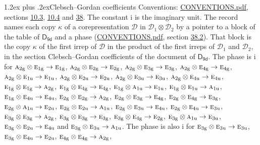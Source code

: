 \documentclass[10pt,a4paper]{article}
\makeatletter
\renewcommand\section{\@startsection{section}{1}{\z@}{-3ex plus -1ex minus -.2ex}%
  {1.2ex plus .2ex}{\normalfont\large\sffamily\bfseries\color{parttitle}}}
\numberwithin{equation}{section}
\newcommand{\grp}[1]{\mathsf{#1}}
\newcommand{\irr}[1]{\text{\normalfont\scshape #1}}
\newcommand{\ptag}[1]{\mathrm{#1}}
\newcommand{\iunit}{\mathrm{i}}
\newcommand{\irrprod}{\otimes}
\newcommand{\mult}{\kappa}
\makeatother
\begin{document}
\section{Clebsch--Gordan coefficients}\label{s:clebsch_gordan}
Conventions: \href{../../CONVENTIONS.pdf}{CONVENTIONS.pdf}, sections \href{../../../rotation/CONVENTIONS.pdf\#conv.10.3}{10.3}, \href{../../../rotation/CONVENTIONS.pdf\#conv.10.4}{10.4} and \href{../../CONVENTIONS.pdf\#conv.38}{38}.
The constant $\iunit$ is the imaginary unit.
\leavevmode\label{n:index.copy}The record names each copy $\mult$ of a corepresentation $\mathcal{D}$ in $\mathcal{D}_1\irrprod\mathcal{D}_2$ by a pointer to a block of the table of $\grp{D_{9d}}$ and a phase (\href{../../CONVENTIONS.pdf}{CONVENTIONS.pdf}, section \href{../../CONVENTIONS.pdf\#conv.38.2}{38.2}). That block is the copy $\mult$ of the first irrep of $\mathcal{D}$ in the product of the first irreps of $\mathcal{D}_1$ and $\mathcal{D}_2$, in the section Clebsch--Gordan coefficients of the document of \href{../../../rotation/data/pdf/D9d.pdf}{$\grp{D_{9d}}$}. The phase is $\iunit$ for $\irr{a}_{2\ptag{g}}\irrprod \irr{e}_{1\ptag{g}}\to \irr{e}_{1\ptag{g}}$, $\irr{a}_{2\ptag{g}}\irrprod \irr{e}_{2\ptag{g}}\to \irr{e}_{2\ptag{g}}$, $\irr{a}_{2\ptag{g}}\irrprod \irr{e}_{3\ptag{g}}\to \irr{e}_{3\ptag{g}}$, $\irr{a}_{2\ptag{g}}\irrprod \irr{e}_{4\ptag{g}}\to \irr{e}_{4\ptag{g}}$, $\irr{a}_{2\ptag{g}}\irrprod \irr{e}_{1\ptag{u}}\to \irr{e}_{1\ptag{u}}$, $\irr{a}_{2\ptag{g}}\irrprod \irr{e}_{2\ptag{u}}\to \irr{e}_{2\ptag{u}}$, $\irr{a}_{2\ptag{g}}\irrprod \irr{e}_{3\ptag{u}}\to \irr{e}_{3\ptag{u}}$, $\irr{a}_{2\ptag{g}}\irrprod \irr{e}_{4\ptag{u}}\to \irr{e}_{4\ptag{u}}$, $\irr{e}_{1\ptag{g}}\irrprod \irr{e}_{1\ptag{g}}\to \irr{a}_{2\ptag{g}}$, $\irr{e}_{1\ptag{g}}\irrprod \irr{e}_{4\ptag{g}}\to \irr{e}_{4\ptag{g}}$, $\irr{e}_{1\ptag{g}}\irrprod \irr{a}_{1\ptag{u}}\to \irr{e}_{1\ptag{u}}$, $\irr{e}_{1\ptag{g}}\irrprod \irr{e}_{1\ptag{u}}\to \irr{a}_{1\ptag{u}}$, $\irr{e}_{1\ptag{g}}\irrprod \irr{e}_{4\ptag{u}}\to \irr{e}_{4\ptag{u}}$, $\irr{e}_{2\ptag{g}}\irrprod \irr{e}_{2\ptag{g}}\to \irr{a}_{2\ptag{g}}$, $\irr{e}_{2\ptag{g}}\irrprod \irr{e}_{3\ptag{g}}\to \irr{e}_{4\ptag{g}}$, $\irr{e}_{2\ptag{g}}\irrprod \irr{e}_{4\ptag{g}}\to \irr{e}_{3\ptag{g}}$, $\irr{e}_{2\ptag{g}}\irrprod \irr{a}_{1\ptag{u}}\to \irr{e}_{2\ptag{u}}$, $\irr{e}_{2\ptag{g}}\irrprod \irr{e}_{2\ptag{u}}\to \irr{a}_{1\ptag{u}}$, $\irr{e}_{2\ptag{g}}\irrprod \irr{e}_{3\ptag{u}}\to \irr{e}_{4\ptag{u}}$, $\irr{e}_{2\ptag{g}}\irrprod \irr{e}_{4\ptag{u}}\to \irr{e}_{3\ptag{u}}$, $\irr{e}_{3\ptag{g}}\irrprod \irr{e}_{3\ptag{g}}\to \irr{a}_{2\ptag{g}}$, $\irr{e}_{3\ptag{g}}\irrprod \irr{e}_{3\ptag{g}}\to \irr{e}_{3\ptag{g}}$, $\irr{e}_{3\ptag{g}}\irrprod \irr{e}_{4\ptag{g}}\to \irr{e}_{2\ptag{g}}$, $\irr{e}_{3\ptag{g}}\irrprod \irr{a}_{1\ptag{u}}\to \irr{e}_{3\ptag{u}}$, $\irr{e}_{3\ptag{g}}\irrprod \irr{e}_{2\ptag{u}}\to \irr{e}_{4\ptag{u}}$ and $\irr{e}_{3\ptag{g}}\irrprod \irr{e}_{3\ptag{u}}\to \irr{a}_{1\ptag{u}}$. The phase is also $\iunit$ for $\irr{e}_{3\ptag{g}}\irrprod \irr{e}_{3\ptag{u}}\to \irr{e}_{3\ptag{u}}$, $\irr{e}_{3\ptag{g}}\irrprod \irr{e}_{4\ptag{u}}\to \irr{e}_{2\ptag{u}}$, $\irr{e}_{4\ptag{g}}\irrprod \irr{e}_{4\ptag{g}}\to \irr{a}_{2\ptag{g}}$, 
\end{document}
